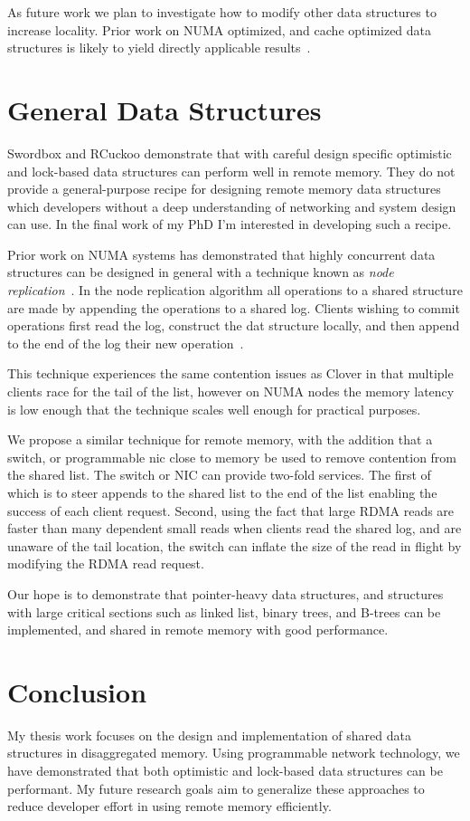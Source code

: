 As future work we plan to investigate how to modify other
data structures to increase locality.  Prior work on NUMA
optimized, and cache optimized data structures is likely to
yield directly applicable results~\cite{hopscotch}.

\section{General Data Structures}

Swordbox and RCuckoo demonstrate that with careful design
specific optimistic and lock-based data structures can
perform well in remote memory. They do not provide a
general-purpose recipe for designing remote memory data
structures which developers without a deep understanding of
networking and system design can use. In the final work of
my PhD I'm interested in developing such a recipe.

Prior work on NUMA systems has demonstrated that highly
concurrent data structures can be designed in general with a
technique known as \textit{node
replication}~\cite{black-box-numa}. In the node replication
algorithm all operations to a shared structure are made by
appending the operations to a shared log. Clients wishing to
commit operations first read the log, construct the dat
structure locally, and then append to the end of the log
their new operation~\cite{black-box-numa}.

This technique experiences the same contention issues as
Clover in that multiple clients race for the tail of the
list, however on NUMA nodes the memory latency is low enough
that the technique scales well enough for practical
purposes. 

We propose a similar technique for remote memory, with the
addition that a switch, or programmable nic close to memory be
used to remove contention from the shared list. The switch
or NIC can provide two-fold services. The first of which is
to steer appends to the shared list to the end of the list
enabling the success of each client request. Second, using
the fact that large RDMA reads are faster than many
dependent small reads  when clients read the shared log, and
are unaware of the tail location, the switch can inflate the
size of the read in flight by modifying the RDMA read
request. 

Our hope is to demonstrate that pointer-heavy data
structures, and structures with large critical sections such
as linked list, binary trees, and B-trees can be
implemented, and shared in remote memory with good
performance.

\section{Conclusion}

My thesis work focuses on the design and implementation of
shared data structures in disaggregated memory. Using
programmable network technology, we have demonstrated that
both optimistic and lock-based data structures can be
performant. My future research goals aim to generalize these
approaches to reduce developer effort in using remote memory
efficiently.
